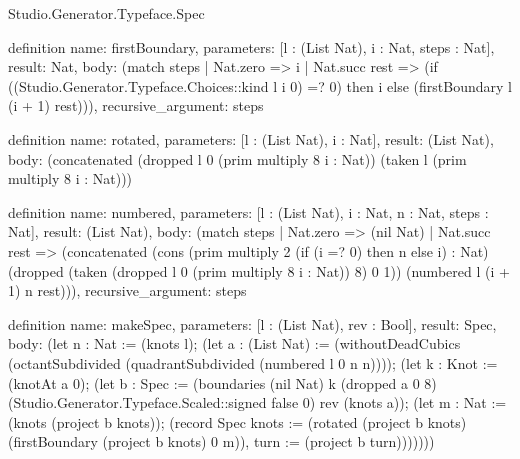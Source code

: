 \begin{lexlean}{Studio.Generator.Typeface.Spec}
\begin{semanticmodule}
definition{
  name: firstBoundary,
  parameters: [l : (List Nat), i : Nat, steps : Nat],
  result: Nat,
  body: (match steps
    | Nat.zero => i
    | Nat.succ rest => (if ((Studio.Generator.Typeface.Choices::kind l i 0) =? 0) then i else (firstBoundary l (i + 1) rest))),
  recursive_argument: steps
}

definition{
  name: rotated,
  parameters: [l : (List Nat), i : Nat],
  result: (List Nat),
  body: (concatenated (dropped l 0 (prim multiply 8 i : Nat)) (taken l (prim multiply 8 i : Nat)))
}

definition{
  name: numbered,
  parameters: [l : (List Nat), i : Nat, n : Nat, steps : Nat],
  result: (List Nat),
  body: (match steps
    | Nat.zero => (nil Nat)
    | Nat.succ rest => (concatenated (cons (prim multiply 2 (if (i =? 0) then n else i) : Nat) (dropped (taken (dropped l 0 (prim multiply 8 i : Nat)) 8) 0 1)) (numbered l (i + 1) n rest))),
  recursive_argument: steps
}

definition{
  name: makeSpec,
  parameters: [l : (List Nat), rev : Bool],
  result: Spec,
  body: (let n : Nat := (knots l); (let a : (List Nat) := (withoutDeadCubics (octantSubdivided (quadrantSubdivided (numbered l 0 n n)))); (let k : Knot := (knotAt a 0); (let b : Spec := (boundaries (nil Nat) k (dropped a 0 8) (Studio.Generator.Typeface.Scaled::signed false 0) rev (knots a)); (let m : Nat := (knots (project b knots)); (record Spec {knots := (rotated (project b knots) (firstBoundary (project b knots) 0 m)), turn := (project b turn)}))))))
}


\end{semanticmodule}
\end{lexlean}

